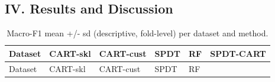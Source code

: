 \documentclass[
  conference]{IEEEtran}
\begin{document}
\subsection{IV. Results and
Discussion}\label{iv.-results-and-discussion}

\begin{longtable}[]{@{}
  >{\raggedright\arraybackslash}p{}
  >{\raggedright\arraybackslash}p{}
  >{\raggedright\arraybackslash}p{}
  >{\raggedright\arraybackslash}p{}
  >{\raggedright\arraybackslash}p{}
  >{\raggedright\arraybackslash}p{}@{}}
\caption{Macro-F1 mean +/- sd (descriptive, fold-level) per dataset and
method.}\tabularnewline
\toprule\noalign{}
\begin{minipage}[b]{\linewidth}\raggedright
Dataset
\end{minipage} & \begin{minipage}[b]{\linewidth}\raggedright
CART-skl
\end{minipage} & \begin{minipage}[b]{\linewidth}\raggedright
CART-cust
\end{minipage} & \begin{minipage}[b]{\linewidth}\raggedright
SPDT
\end{minipage} & \begin{minipage}[b]{\linewidth}\raggedright
RF
\end{minipage} & \begin{minipage}[b]{\linewidth}\raggedright
SPDT-CART
\end{minipage} \\
\midrule\noalign{}
\endfirsthead
\toprule\noalign{}
\begin{minipage}[b]{\linewidth}\raggedright
Dataset
\end{minipage} & \begin{minipage}[b]{\linewidth}\raggedright
CART-skl
\end{minipage} & \begin{minipage}[b]{\linewidth}\raggedright
CART-cust
\end{minipage} & \begin{minipage}[b]{\linewidth}\raggedright
SPDT
\end{minipage} & \begin{minipage}[b]{\linewidth}\raggedright
RF
\end{minipage} & \begin{minipage}[b]{\linewidth}\raggedright

\end{minipage}
\end{longtable}
\end{document}

